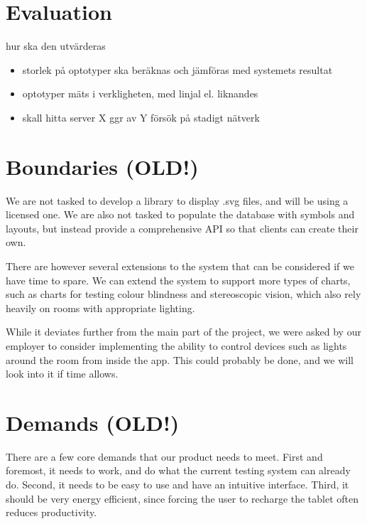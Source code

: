 \documentclass[12pt,a4paper,notitlepage]{report}
\begin{document}
\section{Evaluation}
hur ska den utvärderas
\begin{itemize}
\item storlek på optotyper ska beräknas och jämföras med systemets resultat
\item optotyper mäts i verkligheten, med linjal el. liknandes
\item skall hitta server X ggr av Y försök på stadigt nätverk

\end{itemize}



\section{Boundaries (OLD!)} 
We are not tasked to develop a library to display .svg files, and will be using a licensed one. We are also not tasked to populate the database with symbols and layouts, but instead provide a comprehensive API so that clients can create their own.


There are however several extensions to the system that can be considered if we have time to spare. We can extend the system to support more types of charts, such as charts for testing colour blindness and stereoscopic vision, which also rely heavily on rooms with appropriate lighting.

While it deviates further from the main part of the project, we were asked by our employer to consider implementing the ability to control devices such as lights around the room from inside the app. This could probably be done, and we will look into it if time allows.

\section{Demands (OLD!)} %
There are a few core demands that our product needs to meet. First and foremost, it needs to work, and do what the current testing system can already do. Second, it needs to be easy to use and have an intuitive interface. Third, it should be very energy efficient, since forcing the user to recharge the tablet often reduces productivity. 
\end{document}
